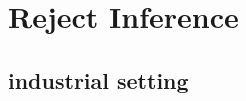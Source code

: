 \documentclass[english,xcolor={rgb,dvipsnames,table,usenames}]{beamer}
\DeclareMathOperator*{\argmin}{\arg\!\min}
\newcommand{\yslant}{0.5}
\newcommand{\xslant}{-0.6}
\begin{document}
%
%
%
%
%
%
%
%
%
%
%
%
%
%
%
%
%
%
%





\section{Reject Inference}

\subsection{industrial setting}
\end{document}
